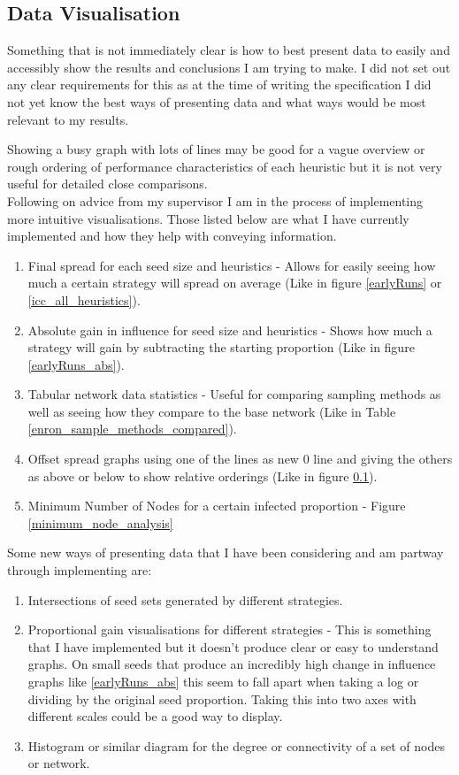 \documentclass{article}
\begin{document}
\subsection{Data Visualisation}

Something that is not immediately clear is how to best present data to easily and accessibly show the results and conclusions I am trying to make.
I did not set out any clear requirements for this as at the time of writing the specification I did not yet know the best ways of presenting data and what ways would be most relevant to my results.

Showing a busy graph with lots of lines may be good for a vague overview or rough ordering of performance characteristics of each heuristic but it is not very useful for detailed close comparisons.
\\

Following on advice from my supervisor I am in the process of implementing more intuitive visualisations.
Those listed below are what I have currently implemented and how they help with conveying information.

\begin{enumerate}
	\item Final spread for each seed size and heuristics - Allows for easily seeing how much a certain strategy will spread on average (Like in figure \ref{earlyRuns} or \ref{icc_all_heuristics}).
	\item Absolute gain in influence for seed size and heuristics - Shows how much a strategy will gain by subtracting the starting proportion (Like in figure \ref{earlyRuns_abs}).
	\item Tabular network data statistics - Useful for comparing sampling methods as well as seeing how they compare to the base network (Like in Table \ref{enron_sample_methods_compared}).
	\item Offset spread graphs using one of the lines as new 0 line and giving the others as above or below to show relative orderings (Like in figure \ref{}).
	\item Minimum Number of Nodes for a certain infected proportion - Figure \ref{minimum_node_analysis}
\end{enumerate}

Some new ways of presenting data that I have been considering and am partway through implementing are:

\begin{enumerate}
	\item Intersections of seed sets generated by different strategies. \label{todo-vis-intersections}
	\item Proportional gain visualisations for different strategies - This is something that I have implemented but it doesn't produce clear or easy to understand graphs.
	      On small seeds that produce an incredibly high change in influence graphs like \ref{earlyRuns_abs} this seem to fall apart when taking a log or dividing by the original seed proportion. Taking this into two axes with different scales could be a good way to display.
	\item Histogram or similar diagram for the degree or connectivity of a set of nodes or network.
\end{enumerate}
\end{document}
